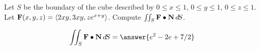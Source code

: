 \documentclass{ximera}
\author{David Guichard \and Neal Koblitz \and H. Jerome Keisler \and Albert Scheller \and Barry Balof \and Mike Wills \and Matthew Carr}
\begin{document}
\begin{exercise}




Let $S$ be the boundary of the cube described by $0\le x\le 1$, $0\le y\le 1$, $0\le z\le 1$. Let $\mathbf{F}(x,y,z)=\left\langle 2xy,3xy,z e^{x+y}\right\rangle$. Compute $\iint_{S}\mathbf{F}\bullet\mathbf{N}\mathop{}\!d\! S$.

\begin{prompt}
\[
\iint_{S}\vec{F}\dotp\vec{N}\d S=\answer{e^2-2e+7/2}
\]
\end{prompt}


\end{exercise}
\end{document}
